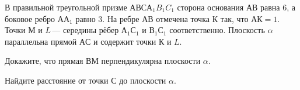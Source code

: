 \begin{ex}
	\begin{condition}
		В правильной треугольной призме \( АВСА_1B_1C_1 \) сторона основания \( АВ \) равна \( 6 \), а боковое ребро \( АА_1 \) равно \( 3 \). На ребре \( АВ \) отмечена точка \( К \) так, что \( АК = 1 \). Точки \( М \) и \( L \) — середины рёбер \( А_1С_1 \) и \( В_1С_1 \) соответственно. Плоскость \( \alpha \) параллельна прямой \( АС \) и содержит точки \( К \) и \( L \).
		\begin{enumcols}[label=\asbuk*)]
			\item Докажите, что прямая \( ВМ \) перпендикулярна плоскости \( \alpha \).
			\item Найдите расстояние от точки \( С \) до плоскости \( \alpha \).
		\end{enumcols}
	\end{condition}
\end{ex}